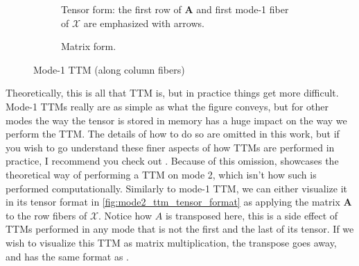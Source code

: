         \def\m{2.25}
        \def\n{1.25}
        \def\p{1.25}
        \def\q{1}
        \def\r{2.5}
        \def\s{0.75}
        \def\mslices{5}
        \def\nslices{3}
        \def\pslices{4}
        \def\rot{90}
        \def\namedistance{0.3}
        \def\distance{0.2}
        \def\arrowdistancex{0.1}
        \def\arrowdistancey{0.25}
        \begin{figure}[ht]

            \centering
            
            \begin{subfigure}[b]{0.99\textwidth}
                \centering
                
                \caption[Mode 1 TTM Tensor Format]{Tensor form: the first row of $\mathbf{A}$ and first mode-1 fiber of $\mathcal{X}$ are emphasized with arrows.}
                \label{fig:mode1_ttm_tensor_format}
            \end{subfigure}
            
            \vspace{1em}
            
            \begin{subfigure}[b]{0.99\textwidth}
                \centering
                
                \caption[Mode 1 TTM Tensor Format]{Matrix form.}
                \label{fig:mode1_ttm_matrix_format}
            \end{subfigure}

            \caption[Mode-1 TTM]{Mode-1 TTM (along column fibers)}
            \label{fig:Mode-1_TTM}
        \end{figure}

        Theoretically, this is all that TTM is, but in practice things get more
        difficult. Mode-1 TTMs really are as simple as what the figure conveys,
        but for other modes the way the tensor is stored in memory has a huge
        impact on the way we perform the TTM. The details of how to do so are
        omitted in this work, but if you wish to go understand these finer
        aspects of how TTMs are performed in practice, I recommend you check out
        \cite{Big_Boss}. Because of this omission, 
        showcases the theoretical way of performing a TTM on mode 2, which isn't
        how such is performed computationally. Similarly to mode-1 TTM, we can
        either visualize it in its tensor format in
        \ref{fig:mode2_ttm_tensor_format} as applying the matrix $\mathbf{A}$ to
        the row fibers of $\mathcal{X}$. Notice how $A$ is transposed here, this
        is a side effect of TTMs performed in any mode that is not the first and
        the last of its tensor. If we wish to visualize this TTM as matrix
        multiplication, the transpose goes away, and
         has the same format as
        .

